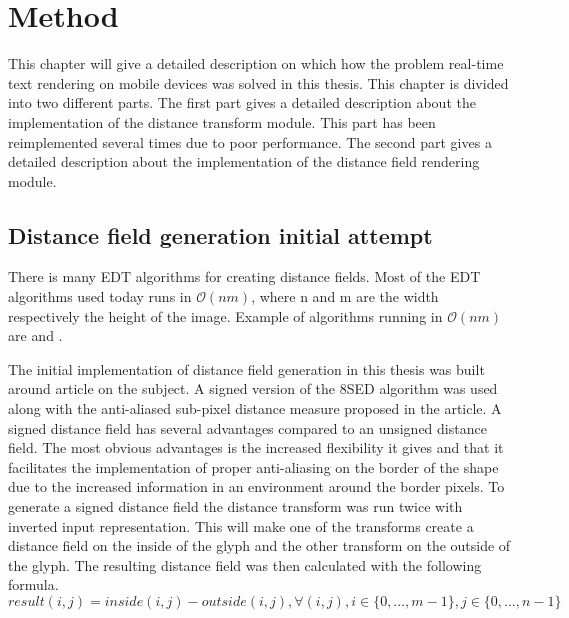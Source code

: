 \chapter{Method}\label{cha:method}
This chapter will give a detailed description on which how the problem real-time text rendering on mobile devices was solved in this thesis. This chapter is divided into two different parts. The first part gives a detailed description about the implementation of the distance transform module. This part has been reimplemented several times due to poor performance. The second part gives a detailed description about the implementation of the distance field rendering module.

\section{Distance field generation initial attempt}
There is many EDT algorithms for creating distance fields. Most of the EDT algorithms used today runs in $\mathcal{O}(nm)$, where n and m are the width respectively the height of the image. Example of algorithms running in $\mathcal{O}(nm)$ are \citet{Danielsson} and \citet{meijster}.

The initial implementation of distance field generation in this thesis was built around \citet{Gustavson:2011} article on the subject. A signed version of the 8SED algorithm was used along with the anti-aliased sub-pixel distance measure proposed in the article. A signed distance field has several advantages compared to an unsigned distance field. The most obvious advantages is the increased flexibility it gives and that it facilitates the implementation of proper anti-aliasing on the border of the shape due to the increased information in an environment around the border pixels\citep{gustavson20122d}. To generate a signed distance field the distance transform was run twice with inverted input representation. This will make one of the transforms create a distance field on the inside of the glyph and the other transform on the outside of the glyph. The resulting distance field was then calculated with the following formula.\vspace{\baselineskip}\newline
$result(i,j) = inside(i,j) - outside(i,j), \forall (i, j), i \in \{0,\dots, m-1\}, j \in \{0,\dots, n-1\}$ \vspace{\baselineskip}\newline
